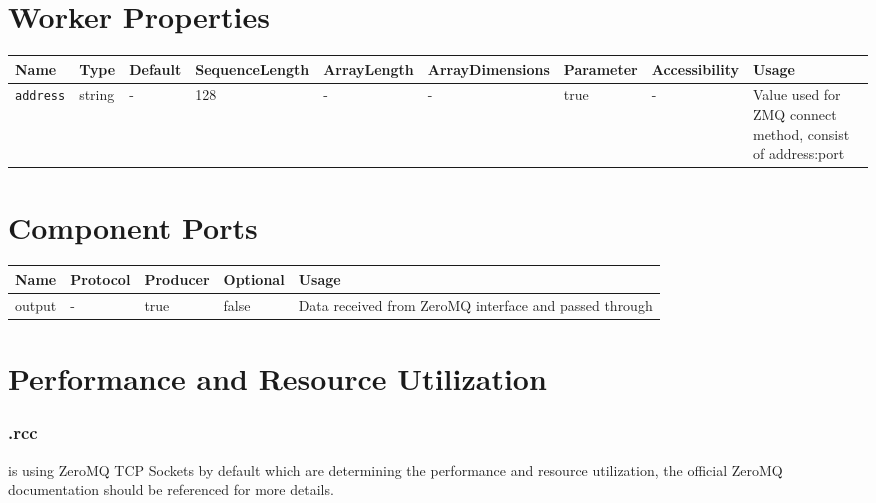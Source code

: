 \begin{landscape}
\section*{Worker Properties}

\begin{flushleft}
        \begin{scriptsize}
        \begin{tabular}{|p{2.5cm}|p{1cm}|p{1.5cm}|p{2cm}|p{2cm}|p{2.5cm}|p{1.5cm}|p{1.5cm}|p{5.5cm}|}
                \hline
                \rowcolor{blue}
                Name & Type & Default & SequenceLength & ArrayLength & ArrayDimensions & Parameter  & Accessibility & Usage \\
                \hline
                \verb+address+ & string & - & 128 & - & - & true & - & Value used for ZMQ connect method, consist of address:port\\
        \end{tabular}
        \end{scriptsize}
\end{flushleft}


\section*{Component Ports}

        \begin{scriptsize}
                \begin{tabular}{|M{2.5cm}|M{2cm}|M{2cm}|M{2.5cm}|M{12.5cm}|}
                        \hline
                        Name & Protocol & Producer & Optional & Usage\\
                        \hline
                        output
                        & -
                        & true
                        & false
                        & Data received from ZeroMQ interface and passed through \\
                        \hline
                \end{tabular}
			\end{scriptsize}
\end{landscape}


\section*{Performance and Resource Utilization}
    \subsubsection*{\comp.rcc}
        {\comp} is using ZeroMQ TCP Sockets by default which are determining the performance and resource utilization, the official ZeroMQ documentation should be referenced for more details. 


